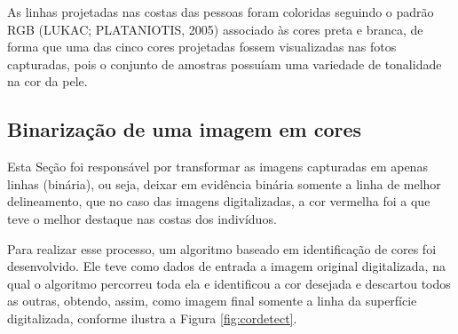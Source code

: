 \documentclass[a4paper, 12pt]{article}
\begin{document}
As linhas projetadas nas costas das pessoas foram coloridas seguindo o padrão RGB (LUKAC; PLATANIOTIS, 2005) associado às cores preta e branca, de forma que uma das cinco cores projetadas fossem visualizadas nas fotos capturadas, pois o conjunto de amostras possuíam uma variedade de tonalidade na cor da pele.

\subsection{Binarização de uma imagem em cores}
\label{subsec:binariza}

Esta Seção foi responsável por transformar as imagens capturadas em apenas linhas (binária), ou seja, deixar em evidência binária somente a linha de melhor delineamento, que no caso das imagens digitalizadas, a cor vermelha foi a que teve o melhor destaque nas costas dos indivíduos.

Para realizar esse processo, um algoritmo baseado em identificação de cores foi desenvolvido. Ele teve como dados de entrada a imagem original digitalizada, na qual o algoritmo percorreu toda ela e identificou a cor desejada e descartou todos as outras, obtendo, assim, como imagem final somente a linha da superfície digitalizada, conforme ilustra a Figura \ref{fig:cordetect}.
\end{document}
